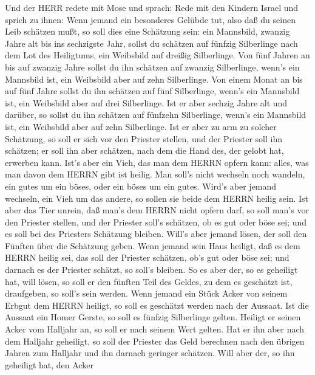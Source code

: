  Und der HERR redete mit Mose und sprach:  Rede
mit den Kindern Israel und sprich zu ihnen: Wenn jemand ein besonderes
Gelübde tut, also daß du seinen Leib schätzen mußt,  so soll
dies eine Schätzung sein: ein Mannsbild, zwanzig Jahre alt bis ins
sechzigste Jahr, sollst du schätzen auf fünfzig Silberlinge nach dem Lot
des Heiligtums,  ein Weibsbild auf dreißig Silberlinge.
 Von fünf Jahren an bis auf zwanzig Jahre sollst du ihn
schätzen auf zwanzig Silberlinge, wenn's ein Mannsbild ist, ein
Weibsbild aber auf zehn Silberlinge.  Von einem Monat an bis
auf fünf Jahre sollst du ihn schätzen auf fünf Silberlinge, wenn's ein
Mannsbild ist, ein Weibsbild aber auf drei Silberlinge.  Ist
er aber sechzig Jahre alt und darüber, so sollst du ihn schätzen auf
fünfzehn Silberlinge, wenn's ein Mannsbild ist, ein Weibsbild aber auf
zehn Silberlinge.  Ist er aber zu arm zu solcher Schätzung,
so soll er sich vor den Priester stellen, und der Priester soll ihn
schätzen; er soll ihn aber schätzen, nach dem die Hand des, der gelobt
hat, erwerben kann.  Ist's aber ein Vieh, das man dem HERRN
opfern kann: alles, was man davon dem HERRN gibt ist heilig.
 Man soll's nicht wechseln noch wandeln, ein gutes um ein
böses, oder ein böses um ein gutes. Wird's aber jemand wechseln, ein
Vieh um das andere, so sollen sie beide dem HERRN heilig sein.
 Ist aber das Tier unrein, daß man's dem HERRN nicht opfern
darf, so soll man's vor den Priester stellen,  und der
Priester soll's schätzen, ob es gut oder böse sei; und es soll bei des
Priesters Schätzung bleiben.  Will's aber jemand lösen, der
soll den Fünften über die Schätzung geben.  Wenn jemand
sein Haus heiligt, daß es dem HERRN heilig sei, das soll der Priester
schätzen, ob's gut oder böse sei; und darnach es der Priester schätzt,
so soll's bleiben.  So es aber der, so es geheiligt hat,
will lösen, so soll er den fünften Teil des Geldes, zu dem es geschätzt
ist, draufgeben, so soll's sein werden.  Wenn jemand ein
Stück Acker von seinem Erbgut dem HERRN heiligt, so soll es geschätzt
werden nach der Aussaat. Ist die Aussaat ein Homer Gerste, so soll es
fünfzig Silberlinge gelten.  Heiligt er seinen Acker vom
Halljahr an, so soll er nach seinem Wert gelten.  Hat er
ihn aber nach dem Halljahr geheiligt, so soll der Priester das Geld
berechnen nach den übrigen Jahren zum Halljahr und ihn darnach geringer
schätzen.  Will aber der, so ihn geheiligt hat, den Acker
